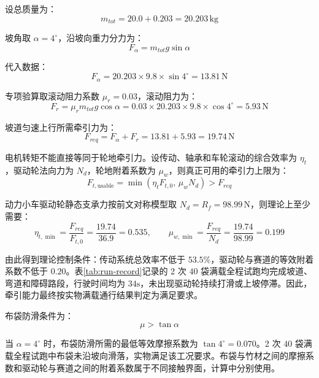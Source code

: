 \documentclass[UTF8,a4paper,12pt,fontset=none]{ctexart}
\numberwithin{equation}{section}
\numberwithin{figure}{section}
\numberwithin{table}{section}
\newcommand{\kg}{\,\mathrm{kg}}
\newcommand{\Nunit}{\,\mathrm{N}}
\begin{document}
设总质量为：
\begin{equation}
  m_{tot}=20.0+0.203=20.203\kg
\end{equation}

坡角取 $\alpha=4^\circ$，沿坡向重力分力为：
\begin{equation}
  F_\alpha=m_{tot}g\sin\alpha
\end{equation}

代入数据：
\begin{equation}
  F_\alpha=20.203\times9.8\times\sin4^\circ=13.81\Nunit
\end{equation}

专项验算取滚动阻力系数 $\mu_r=0.03$，滚动阻力为：
\begin{equation}
  F_r=\mu_rm_{tot}g\cos\alpha=0.03\times20.203\times9.8\times\cos4^\circ=5.93\Nunit
\end{equation}

坡道匀速上行所需牵引力为：
\begin{equation}
  F_{req}=F_\alpha+F_r=13.81+5.93=19.74\Nunit
\end{equation}

电机转矩不能直接等同于轮地牵引力。设传动、轴承和车轮滚动的综合效率为 $\eta_t$，驱动轮法向力为 $N_d$，轮地附着系数为 $\mu_w$，则真正可用的牵引力上限为：
\begin{equation}
  F_{t,\mathrm{usable}}=\min\left(\eta_tF_{t,0},\,\mu_wN_d\right)>F_{req}
\end{equation}

动力小车驱动轮静态支承力按前文对称模型取 $N_d=R_f=98.99\Nunit$，则理论上至少需要：
\begin{equation}
  \eta_{t,\min}=\frac{F_{req}}{F_{t,0}}=\frac{19.74}{36.9}=0.535,
  \qquad
  \mu_{w,\min}=\frac{F_{req}}{N_d}=\frac{19.74}{98.99}=0.199
\end{equation}

由此得到理论控制条件：传动系统总效率不低于 $53.5\%$，驱动轮与赛道的等效附着系数不低于 $0.20$。表\ref{tab:run-record}记录的 2 次 $40$ 袋满载全程试跑均完成坡道、弯道和障碍路段，行驶时间均为 $34\mathrm{s}$，未出现驱动轮持续打滑或上坡停滞。因此，牵引能力最终按实物满载通行结果判定为满足要求。

布袋防滑条件为：
\begin{equation}
  \mu>\tan\alpha
\end{equation}

当 $\alpha=4^\circ$ 时，布袋防滑所需的最低等效摩擦系数为 $\tan4^\circ=0.070$。2 次 $40$ 袋满载全程试跑中布袋未沿坡向滑落，实物满足该工况要求。布袋与竹材之间的摩擦系数和驱动轮与赛道之间的附着系数属于不同接触界面，计算中分别使用。
\end{document}
